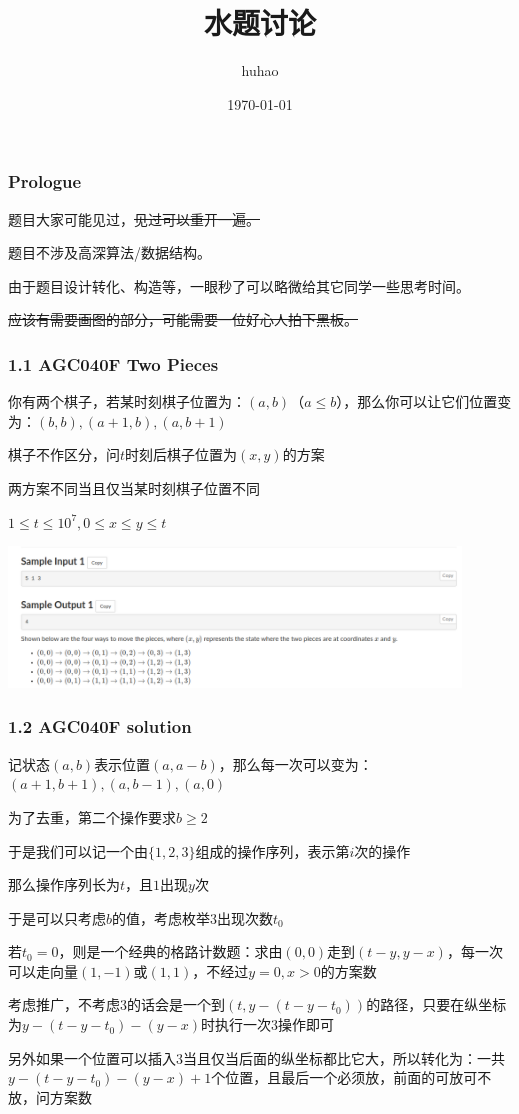 \documentclass[10pt]{beamer}
\begin{document}
\title{水题讨论}
\date{\today}
\author{huhao}
\maketitle
\clearpage
\begin{frame}
	\frametitle{Prologue}

	 题目大家可能见过，\sout{见过可以重开一遍。}

	 题目不涉及高深算法/数据结构。

	 由于题目设计转化、构造等，一眼秒了可以略微给其它同学一些思考时间。

	 \sout{应该有需要画图的部分，可能需要一位好心人拍下黑板。}
\end{frame}
\clearpage
\begin{frame}
	\frametitle{1.1 AGC040F Two Pieces}

	你有两个棋子，若某时刻棋子位置为：$(a,b)$（$a\le b$），那么你可以让它们位置变为：$(b,b),(a+1,b),(a,b+1)$  

	棋子不作区分，问$t$时刻后棋子位置为$(x,y)$的方案  

	两方案不同当且仅当某时刻棋子位置不同  

	$1\le t\le 10^7,0\le x\le y\le t$

	\includegraphics[width=0.9\textwidth]{1.png}

\end{frame}
\clearpage
\begin{frame}
	\frametitle{1.2 AGC040F solution}

	 记状态$(a,b)$表示位置$(a,a-b)$，那么每一次可以变为：$(a+1,b+1),(a,b-1),(a,0)$

	 为了去重，第二个操作要求$b\ge 2$

	 于是我们可以记一个由$\{1,2,3\}$组成的操作序列，表示第$i$次的操作

	 那么操作序列长为$t$，且$1$出现$y$次

	 于是可以只考虑$b$的值，考虑枚举$3$出现次数$t_0$

	 若$t_0=0$，则是一个经典的格路计数题：求由$(0,0)$走到$(t-y,y-x)$，每一次可以走向量$(1,-1)$或$(1,1)$，不经过$y=0,x>0$的方案数

	 考虑推广，不考虑$3$的话会是一个到$(t,y-(t-y-t_0))$的路径，只要在纵坐标为$y-(t-y-t_0)-(y-x)$时执行一次$3$操作即可

	 另外如果一个位置可以插入$3$当且仅当后面的纵坐标都比它大，所以转化为：一共$y-(t-y-t_0)-(y-x)+1$个位置，且最后一个必须放，前面的可放可不放，问方案数

\end{frame}
\end{document}
